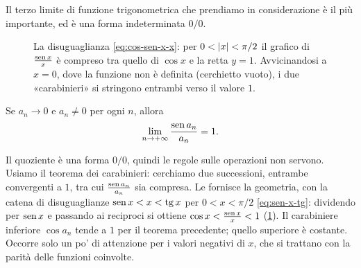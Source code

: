 Il terzo limite di funzione trigonometrica che prendiamo in considerazione è il più
importante, ed è una forma indeterminata $0/0$.

\begin{figure}[htb]
\centering
{}
\caption{La disuguaglianza \eqref{eq:cos-sen-x-x}: per $0<\lvert x\rvert<\pi/2$ il grafico di
$\frac{\operatorname{sen} x}{x}$ è compreso tra quello di $\cos x$ e la retta $y=1$. Avvicinandosi a
$x=0$, dove la funzione non è definita (cerchietto vuoto), i due «carabinieri» si
stringono entrambi verso il valore $1$.}
\label{fig:sen-x-su-x}
\end{figure}

\begin{teorema}\label{teo:sen-x-su-x}
Se $a_{n}\to0$ e $a_{n}\neq0$ per ogni $n$, allora
\begin{equation}\label{eq:lim-sen-x-x}
  \lim_{n\to+\infty}\frac{\operatorname{sen} a_{n}}{a_{n}}=1 .
\end{equation}
\end{teorema}

\begin{schema}
\end{schema}

\begin{strategia}
Il quoziente è una forma $0/0$, quindi le regole sulle operazioni non servono. Usiamo
il teorema dei carabinieri: cerchiamo due successioni, entrambe convergenti a $1$, tra
cui $\frac{\operatorname{sen} a_{n}}{a_{n}}$ sia compresa. Le fornisce la geometria, con la catena di
disuguaglianze $\operatorname{sen} x<x<\operatorname{tg} x$ per $0<x<\pi/2$ \eqref{eq:sen-x-tg}: dividendo per
$\operatorname{sen} x$ e passando ai reciproci si ottiene
$\cos x<\frac{\operatorname{sen} x}{x}<1$ (\cref{fig:sen-x-su-x}). Il carabiniere inferiore $\cos a_{n}$ tende a $1$ per il
teorema precedente; quello superiore è costante. Occorre solo un po' di attenzione per i
valori negativi di $x$, che si trattano con la parità delle funzioni coinvolte.
\end{strategia}

